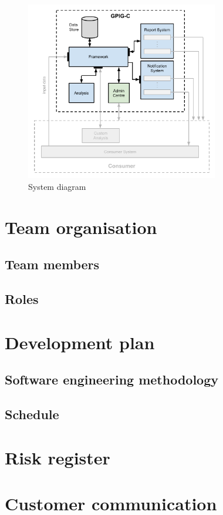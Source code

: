 \documentclass[10pt,a4paper]{article}
\begin{document}
\begin{figure}[hptb]
  \centering
\includegraphics[width=0.75\textwidth]{system-architecture.pdf}
  \caption{System diagram}
\end{figure}

\section{Team organisation}

\subsection{Team members}

\subsection{Roles}


\section{Development plan}

\subsection{Software engineering methodology}

\subsection{Schedule}


\section{Risk register}


\section{Customer communication}
\end{document}
